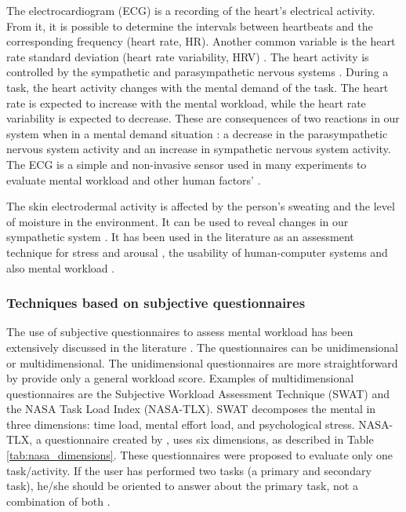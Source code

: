         The electrocardiogram (ECG) is a recording of the heart's electrical activity. From it, it is possible to determine the intervals between heartbeats and the corresponding frequency (heart rate, HR). Another common variable is the heart rate standard deviation (heart rate variability, HRV) \cite{cain2007review}. The heart activity is controlled by the sympathetic and parasympathetic nervous systems \cite{stanton2004handbook}. During a task, the heart activity changes with the mental demand of the task. The heart rate is expected to increase with the mental workload, while the heart rate variability is expected to decrease. These are consequences of two reactions in our system when in a mental demand situation \cite{stanton2004handbook}: a decrease in the parasympathetic nervous system activity and an increase in sympathetic nervous system activity. The ECG is a simple and non-invasive sensor used in many experiments to evaluate mental workload and other human factors' \cite{mohanavelu2020cognitive, mansikka2016fighter, zhang2014detection}.
                
         The skin electrodermal activity is affected by the person's sweating and the level of moisture in the environment. It can be used to reveal changes in our sympathetic system \cite{nourbakhsh2012using, shi2007galvanic}. It has been used in the literature as an assessment technique for stress and arousal \cite{nourbakhsh2012using, stanton2004handbook, shi2007galvanic}, the usability of human-computer systems \cite{shi2007galvanic} and also mental workload \cite{zhang2014detection, borghini2014measuring}.
    
    \subsubsection*{Techniques based on subjective questionnaires}

        The use of subjective questionnaires to assess mental workload has been extensively discussed in the literature \cite{sanders1998human, stanton2004handbook}. The questionnaires can be unidimensional or multidimensional. The unidimensional questionnaires are more straightforward by provide only a general workload score.     Examples of multidimensional questionnaires are the Subjective Workload Assessment Technique (SWAT) and the NASA Task Load Index (NASA-TLX). SWAT decomposes the mental in three dimensions: time load, mental effort load, and psychological stress. NASA-TLX, a questionnaire created by , uses six dimensions, as described in Table \ref{tab:nasa_dimensions}. These questionnaires were proposed to evaluate only one task/activity. If the user has performed two tasks (a primary and secondary task), he/she should be oriented to answer about the primary task, not a combination of both \cite{sanders1998human}.
        
